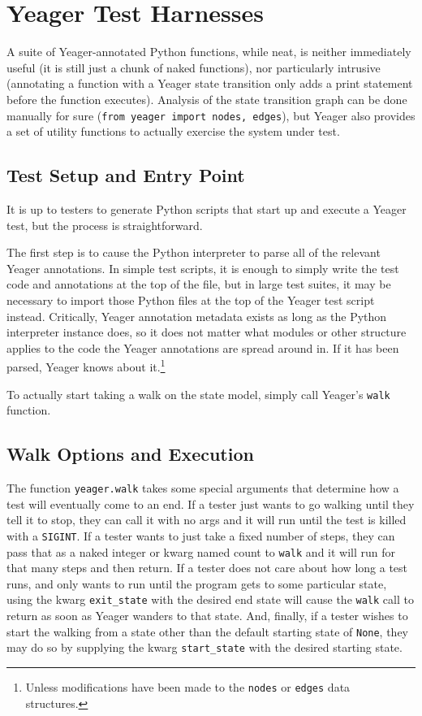 \section{Yeager Test Harnesses}
A suite of Yeager-annotated Python functions, while neat, is neither immediately useful (it is still just a chunk of naked functions), nor particularly intrusive (annotating a function with a Yeager state transition only adds a print statement before the function executes). Analysis of the state transition graph can be done manually for sure (\texttt{from yeager import nodes, edges}), but Yeager also provides a set of utility functions to actually exercise the system under test.

\subsection{Test Setup and Entry Point}
It is up to testers to generate Python scripts that start up and execute a Yeager test, but the process is straightforward.

The first step is to cause the Python interpreter to parse all of the relevant Yeager annotations. In simple test scripts, it is enough to simply write the test code and annotations at the top of the file, but in large test suites, it may be necessary to import those Python files at the top of the Yeager test script instead. Critically, Yeager annotation metadata exists as long as the Python interpreter instance does, so it does not matter what modules or other structure applies to the code the Yeager annotations are spread around in. If it has been parsed, Yeager knows about it.\footnote{Unless modifications have been made to the \texttt{nodes} or \texttt{edges} data structures.}

To actually start taking a walk on the state model, simply call Yeager's \texttt{walk} function.

\subsection{Walk Options and Execution}
The function \texttt{yeager.walk} takes some special arguments that determine how a test will eventually come to an end. If a tester just wants to go walking until they tell it to stop, they can call it with no args and it will run until the test is killed with a \texttt{SIGINT}. If a tester wants to just take a fixed number of steps, they can pass that as a naked integer or kwarg named count to \texttt{walk} and it will run for that many steps and then return. If a tester does not care about how long a test runs, and only wants to run until the program gets to some particular state, using the kwarg \texttt{exit\_state} with the desired end state will cause the \texttt{walk} call to return as soon as Yeager wanders to that state. And, finally, if a tester wishes to start the walking from a state other than the default starting state of \texttt{None}, they may do so by supplying the kwarg \texttt{start\_state} with the desired starting state.

